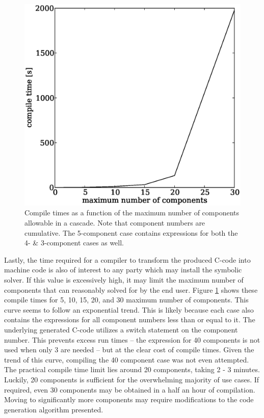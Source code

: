 \documentclass[preprint,12pt]{elsarticle}
\begin{document}
\begin{figure}[htpb]
\begin{center}
\includegraphics[scale=0.5]{compile_times.eps}
\caption{Compile times as a function of the maximum number of components allowable
    in a cascade.  Note that component numbers are cumulative.  The 5-component case 
    contains expressions for both the 4- \& 3-component cases as well.}
\label{compile_times_fig}
\end{center}
\end{figure}

Lastly, the time required for a compiler to transform the produced C-code into 
machine code is also of interest to any party which may install the symbolic solver.
If this value is excessively high, it may limit the maximum number of components
that can reasonably solved for by the end user.  Figure \ref{compile_times_fig}
shows these compile times for 5, 10, 15, 20, and 30 maximum number of components.
This curve seems to follow an exponential trend.  This is likely because each case 
also 
contains the expressions for all component numbers less than or equal to it.  The 
underlying generated C-code utilizes a switch statement
on the component number.  This prevents excess run times -- the expression for 40 
components is not used when only 3 are needed -- but at the clear cost of compile
times.  Given the trend of this curve, compiling the 40 component 
case was not even attempted.  The practical compile time limit lies around 20 
components, taking 2 - 3  minutes.  Luckily, 20 components is sufficient for the
overwhelming majority of use cases.  If required,  even 30 components may be obtained 
in a half an hour of compilation.  Moving to significantly more components may 
require modifications to the code generation algorithm presented.
\end{document}
